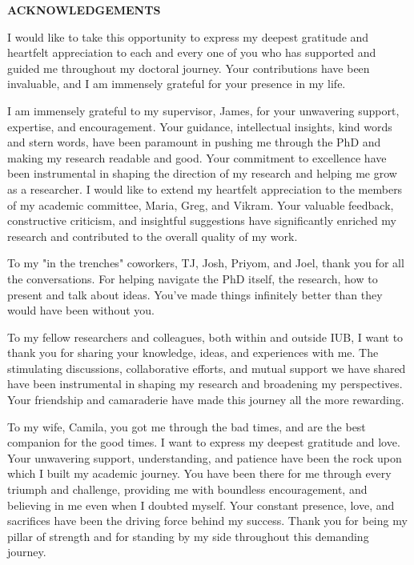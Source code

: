 \begin{centering}
\textbf{ACKNOWLEDGEMENTS}\\
\vspace{\baselineskip}
\end{centering}

I would like to take this opportunity to express my deepest gratitude and heartfelt appreciation to each and every one of you who has supported and guided me throughout my doctoral journey. Your contributions have been invaluable, and I am immensely grateful for your presence in my life.

I am immensely grateful to my supervisor, James, for your unwavering support, expertise, and encouragement. Your guidance, intellectual insights, kind words and stern words, have been paramount in pushing me through the PhD and making my research readable and good. Your commitment to excellence have been instrumental in shaping the direction of my research and helping me grow as a researcher. I would like to extend my heartfelt appreciation to the members of my academic committee, Maria, Greg, and Vikram. Your valuable feedback, constructive criticism, and insightful suggestions have significantly enriched my research and contributed to the overall quality of my work. 

To my "in the trenches" coworkers, TJ, Josh, Priyom, and Joel, thank you for all the conversations. For helping navigate the PhD itself, the research, how to present and talk about ideas. You've made things infinitely better than they would have been without you. 

To my fellow researchers and colleagues, both within and outside IUB, I want to thank you for sharing your knowledge, ideas, and experiences with me. The stimulating discussions, collaborative efforts, and mutual support we have shared have been instrumental in shaping my research and broadening my perspectives. Your friendship and camaraderie have made this journey all the more rewarding.


To my wife, Camila, you got me through the bad times, and are the best companion for the good times. I want to express my deepest gratitude and love. Your unwavering support, understanding, and patience have been the rock upon which I built my academic journey. You have been there for me through every triumph and challenge, providing me with boundless encouragement, and believing in me even when I doubted myself. Your constant presence, love, and sacrifices have been the driving force behind my success. Thank you for being my pillar of strength and for standing by my side throughout this demanding journey.

